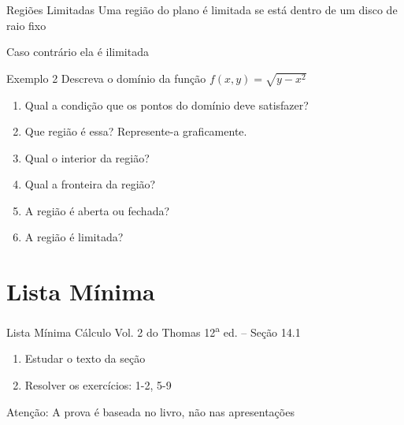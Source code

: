 
\begin{frame}{Regiões Limitadas}
  Uma região do plano é limitada se está dentro de um disco de raio fixo

  \pause
  \vspace{\baselineskip}

  Caso contrário ela é ilimitada
\end{frame}

\begin{frame}{Exemplo 2}
  Descreva o domínio da função \(f(x, y) = \sqrt{y-x^2}\)

  \pause
  \vspace{\baselineskip}
  \begin{enumerate}[<+->]
    \item Qual a condição que os pontos do domínio deve satisfazer?
    \item Que região é essa? Represente-a graficamente.
    \item Qual o interior da região?
    \item Qual a fronteira da região?
    \item A região é aberta ou fechada?
    \item A região é limitada?
  \end{enumerate}
\end{frame}


\section{Lista Mínima}

\begin{frame}{Lista Mínima}
  Cálculo Vol. 2 do Thomas 12\textsuperscript{a} ed. -- Seção 14.1
  \begin{enumerate}
    \item Estudar o texto da seção
    \item Resolver os exercícios: 1-2, 5-9
  \end{enumerate}

  \vfill
  Atenção: A prova é baseada no livro, não nas apresentações
\end{frame}



